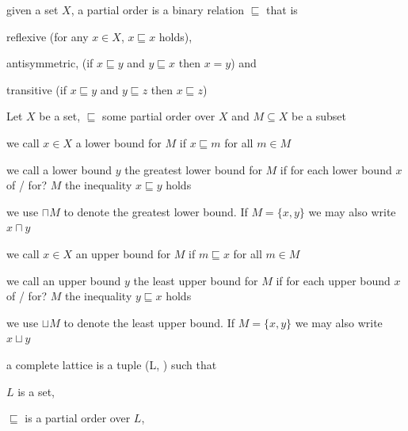 \documentclass[landscape, a4paper]{article}
\begin{document}
\begin{minipage}[t]{0.2\linewidth}
\begin{betterlist}
	\end{betterlist}
	\begin{betterlist}
		\item given a set $X$, a partial order is a binary relation $\sqsubseteq$ that is
		\begin{betterlist}
			\item reflexive (for any $x \in X$, $x \sqsubseteq x$ holds),
			\item antisymmetric, (if $x \sqsubseteq y$ and $y \sqsubseteq x$ then $x = y$) and
			\item transitive (if $x \sqsubseteq y$ and $y \sqsubseteq z$ then $x \sqsubseteq z$)
			\item {}
		\end{betterlist}
		\item Let $X$ be a set, $\sqsubseteq$ some partial order over $X$ and $M \subseteq X$ be a subset
		\begin{betterlist}
			\item we call $x \in X$ a \alert{lower bound} for $M$ if $x \sqsubseteq m$ for all $m \in M$
			\item we call a lower bound $y$ the \alert{greatest lower bound} for $M$ if for each lower bound $x$ of / for? $M$ the inequality $x \sqsubseteq y$ holds
			\begin{betterlist}
				\item we use $\sqcap M$ to denote the \alert{greatest lower bound}. If $M = \{x, y\}$ we may also write $x \sqcap y$
			\end{betterlist}
			\item we call $x \in X$ an \alert{upper bound} for $M$ if $m \sqsubseteq x$ for all $m \in M$
			\item we call an upper bound $y$ the \alert{least upper bound} for $M$ if for each upper bound $x$ of / for? $M$ the inequality $y \sqsubseteq x$ holds
			\begin{betterlist}
				\item we use $\sqcup M$ to denote the \alert{least upper bound}. If $M = \{x, y\}$ we may also write $x \sqcup y$
			\end{betterlist}
		\end{betterlist}
		\item a \alert{complete lattice} is a tuple (L, \sqsubseteq ) such that
		\begin{betterlist}
			\item $L$ is a set,
			\item $\sqsubseteq $ is a \alert{partial order} over $L$,

\end{betterlist}
\end{betterlist}
\end{minipage}
\end{document}
